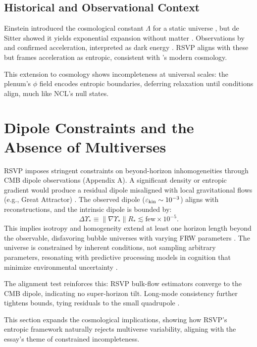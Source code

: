 \documentclass{article}
\begin{document}
\subsection{Historical and Observational Context}
Einstein introduced the cosmological constant \(\Lambda\) for a static universe \citep{einstein1917}, but de Sitter showed it yields exponential expansion without matter \citep{desitter1917}. Observations by \citet{riess1998} and \citet{perlmutter1999} confirmed acceleration, interpreted as dark energy \citep{peebles2003}. RSVP aligns with these but frames acceleration as entropic, consistent with \citet{dodelson2003}'s modern cosmology.

This extension to cosmology shows incompleteness at universal scales: the plenum's \(\phi\) field encodes entropic boundaries, deferring relaxation until conditions align, much like NCL's null states.

\section{Dipole Constraints and the Absence of Multiverses}
\label{sec:dipole}
RSVP imposes stringent constraints on beyond-horizon inhomogeneities through CMB dipole observations (Appendix A). A significant density or entropic gradient would produce a residual dipole misaligned with local gravitational flows (e.g., Great Attractor) \citep{riess1998, perlmutter1999}. The observed dipole (\(\varepsilon_{\rm kin} \sim 10^{-3}\)) aligns with reconstructions, and the intrinsic dipole is bounded by:
\[
\Delta \Upsilon_* \equiv \|\nabla \Upsilon_*\| R_* \lesssim \text{few} \times 10^{-5}.
\]
This implies isotropy and homogeneity extend at least one horizon length beyond the observable, disfavoring bubble universes with varying FRW parameters \citep{dodelson2003}. The universe is constrained by inherent conditions, not sampling arbitrary parameters, resonating with predictive processing models in cognition that minimize environmental uncertainty \citep{clark2013, hohwy2013}.

The alignment test reinforces this: RSVP bulk-flow estimators converge to the CMB dipole, indicating no super-horizon tilt. Long-mode consistency further tightens bounds, tying residuals to the small quadrupole \citep{whittle2006}.

This section expands the cosmological implications, showing how RSVP's entropic framework naturally rejects multiverse variability, aligning with the essay's theme of constrained incompleteness.
\end{document}
